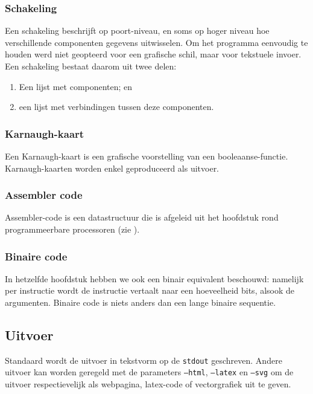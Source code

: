 \subsubsection{Schakeling}
Een schakeling beschrijft op poort-niveau, en soms op hoger niveau hoe verschillende componenten gegevens uitwisselen. Om het programma eenvoudig te houden werd niet geopteerd voor een grafische schil, maar voor tekstuele invoer. Een schakeling bestaat daarom uit twee delen:
\begin{enumerate}
 \item Een lijst met componenten; en
 \item een lijst met verbindingen tussen deze componenten.
\end{enumerate}

\subsubsection{Karnaugh-kaart}
Een Karnaugh-kaart is een grafische voorstelling van een booleaanse-functie. Karnaugh-kaarten worden enkel geproduceerd als uitvoer.
\subsubsection{Assembler code}
Assembler-code is een datastructuur die is afgeleid uit het hoofdstuk rond programmeerbare processoren (zie ).
\subsubsection{Binaire code}
In hetzelfde hoofdstuk hebben we ook een binair equivalent beschouwd: namelijk per instructie wordt de instructie vertaalt naar een hoeveelheid bits, alsook de argumenten. Binaire code is niets anders dan een lange binaire sequentie.
\subsection{Uitvoer}
Standaard wordt de uitvoer in tekstvorm op de \texttt{stdout} geschreven. Andere uitvoer kan worden geregeld met de parameters \texttt{--html}, \texttt{--latex} en \texttt{--svg} om de uitvoer respectievelijk als webpagina, latex-code of vectorgrafiek uit te geven.


